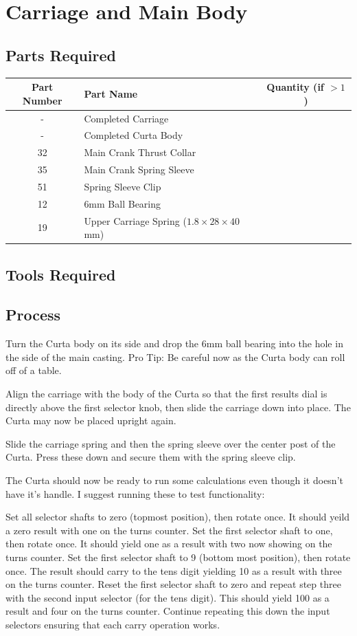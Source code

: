 \documentclass[openany]{book}
\begin{document}
\chapter{Carriage and Main Body}
\section{Parts Required}

\begin{table}[!ht]
	\centering
	\begin{tabular}{clc}
		Part Number & Part Name & Quantity (if $>1$) \\ \hline
		 - & Completed Carriage & \\
		 - & Completed Curta Body & \\
		 32 & Main Crank Thrust Collar & \\
		 35 & Main Crank Spring Sleeve & \\
		 51 & Spring Sleeve Clip & \\ \hline \hline
 		 12 & 6mm Ball Bearing & \\
		 19 & Upper Carriage Spring ($1.8\times28\times40$mm) & 
	\end{tabular}
\end{table}


\section{Tools Required}

\section{Process}
Turn the Curta body on its side and drop the 6mm ball bearing into the hole in the side of the main casting. Pro Tip: Be careful now as the Curta body can roll off of a table.

Align the carriage with the body of the Curta so that the first results dial is directly above the first selector knob, then slide the carriage down into place. The Curta may now be placed upright again.

Slide the carriage spring and then the spring sleeve over the center post of the Curta. Press these down and secure them with the spring sleeve clip.

The Curta should now be ready to run some calculations even though it doesn't have it's handle. I suggest running these to test functionality:

Set all selector shafts to zero (topmost position), then rotate once. It should yeild a zero result with one on the turns counter.
Set the first selector shaft to one, then rotate once. It should yield one as a result with two now showing on the turns counter.
Set the first selector shaft to 9 (bottom most position), then rotate once. The result should carry to the tens digit yielding 10 as a result with three on the turns counter.
Reset the first selector shaft to zero and repeat step three with the second input selector (for the tens digit). This should yield 100 as a result and four on the turns counter.
Continue repeating this down the input selectors ensuring that each carry operation works.
\end{document}
